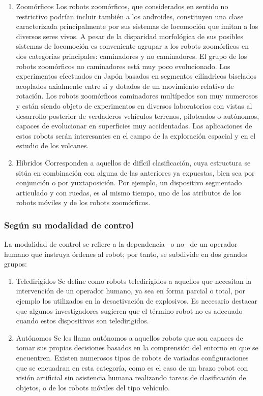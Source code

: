 \begin{enumerate}
	\item Zoomórficos
	Los robots zoomórficos, que considerados en sentido no restrictivo podrían incluir también a los androides, constituyen una clase caracterizada principalmente por sus sistemas de locomoción que imitan a los diversos seres vivos. A pesar de la disparidad morfológica de sus posibles sistemas de locomoción es conveniente agrupar a los robots zoomórficos en dos categorías principales: caminadores y no caminadores. El grupo de los robots zoomórficos no caminadores está muy poco evolucionado. Los experimentos efectuados en Japón basados en segmentos cilíndricos biselados acoplados axialmente entre sí y dotados de un movimiento relativo de rotación. Los robots zoomórficos caminadores multípedos son muy numerosos y están siendo objeto de experimentos en diversos laboratorios con vistas al desarrollo posterior de verdaderos vehículos terrenos, piloteados o autónomos, capaces de evolucionar en superficies muy accidentadas. Las aplicaciones de estos robots serán interesantes en el campo de la exploración espacial y en el estudio de los volcanes.

	\item Híbridos
	Corresponden a aquellos de difícil clasificación, cuya estructura se sitúa en combinación con alguna de las anteriores ya expuestas, bien sea por conjunción o por yuxtaposición. Por ejemplo, un dispositivo segmentado articulado y con ruedas, es al mismo tiempo, uno de los atributos de los robots móviles y de los robots zoomórficos.
\end{enumerate}

\subsubsection{Según su modalidad de control}
La modalidad de control se refiere a la dependencia –o no– de un operador humano que instruya órdenes al robot; por tanto, se subdivide en dos grandes grupos:

\begin{enumerate}
	\itemsep1pt \parskip1pt 
	\item Teledirigidos
	Se define como robots teledirigidos a aquellos que necesitan la intervención de un operador humano, ya sea en forma parcial o total, por ejemplo los utilizados en la desactivación de explosivos. Es necesario destacar que algunos investigadores sugieren que el término robot no es adecuado cuando estos dispositivos son teledirigidos.
	\item Autónomos
	Se les llama autónomos a aquellos robots que son capaces de tomar sus propias decisiones basados en la comprensión del entorno en que se encuentren. Existen numerosos tipos de robots de variadas configuraciones que se encuadran en esta categoría, como es el caso de un brazo robot con visión artificial sin asistencia humana realizando tareas de clasificación de objetos, o de los robots móviles del tipo vehículo.
\end{enumerate}

